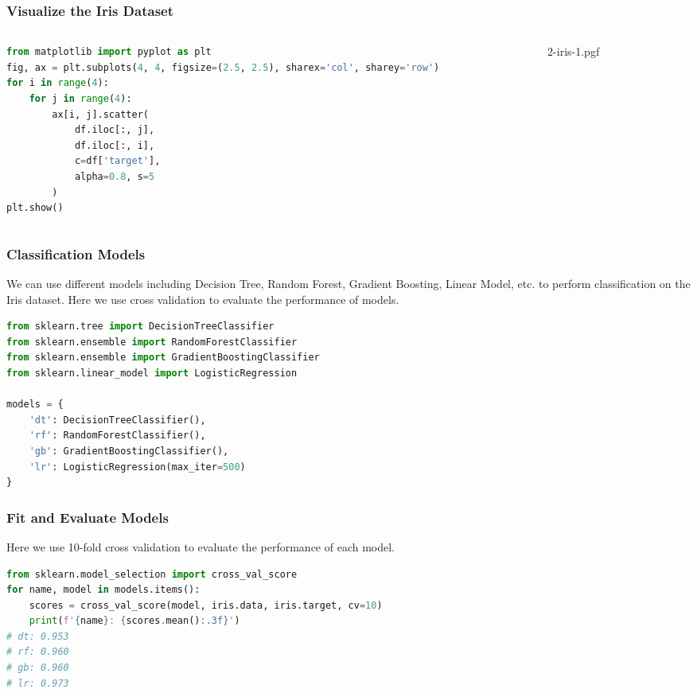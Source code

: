 \documentclass[beamer, en, version=2.0]{huangfusl-template}
\begin{document}
    \begin{frame}[fragile]
        \frametitle{Visualize the Iris Dataset}

        \begin{columns}
            \begin{column}{0.5\textwidth}
\begin{lstlisting}[language=python, breaklines=true]
from matplotlib import pyplot as plt
fig, ax = plt.subplots(4, 4, figsize=(2.5, 2.5), sharex='col', sharey='row')
for i in range(4):
    for j in range(4):
        ax[i, j].scatter(
            df.iloc[:, j],
            df.iloc[:, i],
            c=df['target'],
            alpha=0.8, s=5
        )
plt.show()
\end{lstlisting}
            \end{column}
            \begin{column}{0.5\textwidth}
                \begin{figure}
                    {2-iris-1.pgf}
                \end{figure}
            \end{column}
        \end{columns}
    \end{frame}

    \begin{frame}[fragile]
        \frametitle{Classification Models}

        We can use different models including Decision Tree, Random Forest, Gradient Boosting, Linear Model, etc. to perform classification on the Iris dataset. Here we use cross validation to evaluate the performance of models.

\begin{lstlisting}[language=python]
from sklearn.tree import DecisionTreeClassifier
from sklearn.ensemble import RandomForestClassifier
from sklearn.ensemble import GradientBoostingClassifier
from sklearn.linear_model import LogisticRegression

models = {
    'dt': DecisionTreeClassifier(),
    'rf': RandomForestClassifier(),
    'gb': GradientBoostingClassifier(),
    'lr': LogisticRegression(max_iter=500)
}
\end{lstlisting}

    \end{frame}

    \begin{frame}[fragile]
        \frametitle{Fit and Evaluate Models}

        Here we use 10-fold cross validation to evaluate the performance of each model.
\begin{lstlisting}[language=python]
from sklearn.model_selection import cross_val_score
for name, model in models.items():
    scores = cross_val_score(model, iris.data, iris.target, cv=10)
    print(f'{name}: {scores.mean():.3f}')
# dt: 0.953
# rf: 0.960
# gb: 0.960
# lr: 0.973
\end{lstlisting}
    \end{frame}
\end{document}
